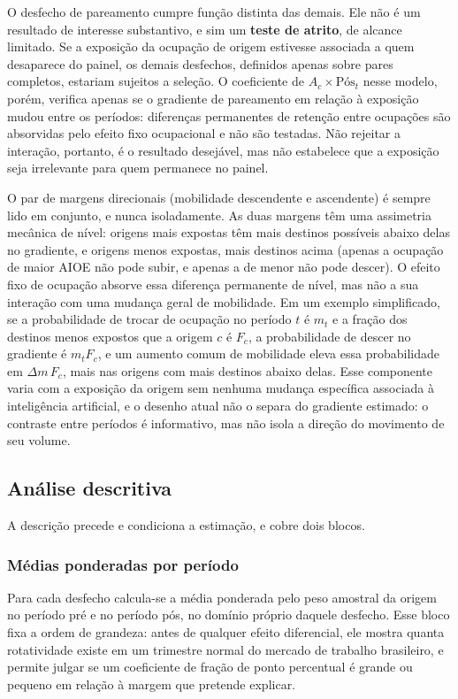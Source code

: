 O desfecho de pareamento cumpre função distinta das demais. Ele não é um resultado de interesse substantivo, e sim um \textbf{teste de
atrito}, de alcance limitado. Se a exposição da ocupação de origem estivesse
associada a quem desaparece do painel, os demais desfechos, definidos apenas
sobre pares completos, estariam sujeitos a seleção. O coeficiente de
$A_c \times \text{Pós}_t$ nesse modelo, porém, verifica apenas se o gradiente de
pareamento em relação à exposição mudou entre os períodos: diferenças
permanentes de retenção entre ocupações são absorvidas pelo efeito fixo
ocupacional e não são testadas. Não rejeitar a interação, portanto, é o
resultado desejável, mas não estabelece que a exposição seja irrelevante para
quem permanece no painel.

O par de margens direcionais (mobilidade descendente e ascendente) é
sempre lido em conjunto, e nunca isoladamente. As duas margens têm uma
assimetria mecânica de nível: origens mais expostas têm mais destinos possíveis
abaixo delas no gradiente, e origens menos expostas, mais destinos acima (apenas
a ocupação de maior AIOE não pode subir, e apenas a de menor não pode descer). O
efeito fixo de ocupação absorve essa diferença permanente de nível, mas não a
sua interação com uma mudança geral de mobilidade. Em um exemplo simplificado,
se a probabilidade de trocar de ocupação no período $t$ é $m_t$ e a fração dos
destinos menos expostos que a origem $c$ é $F_c$, a probabilidade de descer no
gradiente é $m_t F_c$, e um aumento comum de mobilidade eleva essa probabilidade
em $\Delta m \, F_c$, mais nas origens com mais destinos abaixo delas. Esse
componente varia com a exposição da origem sem nenhuma mudança específica
associada à inteligência artificial, e o desenho atual não o separa do
gradiente estimado: o contraste entre períodos é informativo, mas não isola a
direção do movimento de seu volume.

\subsection{Análise descritiva}

A descrição precede e condiciona a estimação, e cobre dois blocos.

\subsubsection{Médias ponderadas por período}

Para cada desfecho calcula-se a média ponderada pelo peso amostral da origem no
período pré e no período pós, no domínio próprio daquele desfecho. Esse bloco
fixa a ordem de grandeza: antes de qualquer efeito diferencial, ele mostra
quanta rotatividade existe em um trimestre normal do mercado de trabalho
brasileiro, e permite julgar se um coeficiente de fração de ponto percentual é
grande ou pequeno em relação à margem que pretende explicar.

